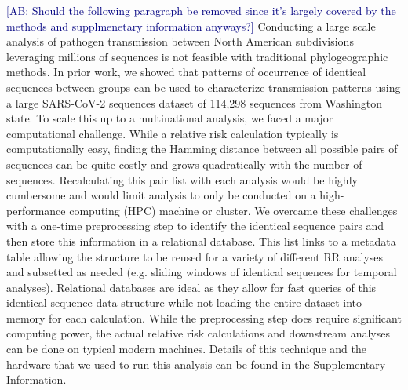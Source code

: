 \documentclass[11pt, letterpaper, oneside]{article}
\def\abc#1{\textcolor{navy}{[AB: #1]}}
\begin{document}
\abc{Should the following paragraph be removed since it's largely covered by the methods and supplmenetary information anyways?}
Conducting a large scale analysis of pathogen transmission between North American subdivisions leveraging millions of sequences is not feasible with traditional phylogeographic methods.
In prior work, we showed that patterns of occurrence of identical sequences between groups can be used to characterize transmission patterns using a large SARS-CoV-2 sequences dataset of 114,298 sequences from Washington state.\autocite{tran-kiemFinescalePatternsSARSCoV22025a}
To scale this up to a multinational analysis, we faced a major computational challenge.
While a relative risk calculation typically is computationally easy, finding the Hamming distance between all possible pairs of sequences can be quite costly and grows quadratically with the number of sequences.
Recalculating this pair list with each analysis would be highly cumbersome and would limit analysis to only be conducted on a high-performance computing (HPC) machine or cluster.
We overcame these challenges with a one-time preprocessing step to identify the identical sequence pairs and then store this information in a relational database.
This list links to a metadata table allowing the structure to be reused for a variety of different RR analyses and subsetted as needed (e.g. sliding windows of identical sequences for temporal analyses).
Relational databases are ideal as they allow for fast queries of this identical sequence data structure while not loading the entire dataset into memory for each calculation.
While the preprocessing step does require significant computing power, the actual relative risk calculations and downstream analyses can be done on typical modern machines.
Details of this technique and the hardware that we used to run this analysis can be found in the Supplementary Information.
\end{document}
